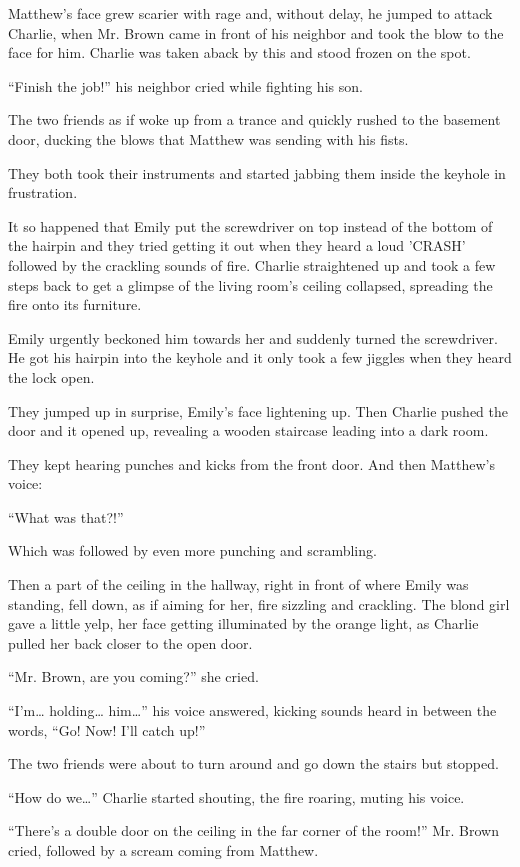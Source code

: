 Matthew's face grew scarier with rage and, without delay, he jumped to attack Charlie, when Mr. Brown came in front of his neighbor and took the blow to the face for him. Charlie was taken aback by this and stood frozen on the spot.

“Finish the job!” his neighbor cried while fighting his son.

The two friends as if woke up from a trance and quickly rushed to the basement door, ducking the blows that Matthew was sending with his fists.

They both took their instruments and started jabbing them inside the keyhole in frustration. 

It so happened that Emily put the screwdriver on top instead of the bottom of the hairpin and they tried getting it out when they heard a loud 'CRASH' followed by the crackling sounds of fire. Charlie straightened up and took a few steps back to get a glimpse of the living room's ceiling collapsed, spreading the fire onto its furniture.

Emily urgently beckoned him towards her and suddenly turned the screwdriver. He got his hairpin into the keyhole and it only took a few jiggles when they heard the lock open.

They jumped up in surprise, Emily's face lightening up. Then Charlie pushed the door and it opened up, revealing a wooden staircase leading into a dark room.

They kept hearing punches and kicks from the front door. And then Matthew's voice:

“What was that?!”

Which was followed by even more punching and scrambling.

Then a part of the ceiling in the hallway, right in front of where Emily was standing, fell down, as if aiming for her, fire sizzling and crackling. The blond girl gave a little yelp, her face getting illuminated by the orange light, as Charlie pulled her back closer to the open door.

“Mr. Brown, are you coming?” she cried.

“I'm… holding… him…” his voice answered, kicking sounds heard in between the words, “Go! Now! I'll catch up!”

The two friends were about to turn around and go down the stairs but stopped.

“How do we…” Charlie started shouting, the fire roaring, muting his voice.

“There's a double door on the ceiling in the far corner of the room!” Mr. Brown cried, followed by a scream coming from Matthew.

